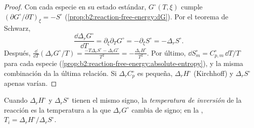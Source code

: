 \begin{proof}
Con cada especie en su estado estándar, $G^\circ(T, \xi)$ cumple $(\partial
G^\circ/\partial T)_\xi = -S^\circ$ (\cref{prop:b2:reaction-free-energy:dG}).
Por el teorema de Schwarz,
\[
  \frac{\dd\Delta_r G^\circ}{\dd T} = \partial_\xi\partial_T G^\circ =
  -\partial_\xi S^\circ = -\Delta_r S^\circ .
\] Después, $\frac{\dd}{\dd
T}(\Delta_r G^\circ/T) = \frac{-T\Delta_r S^\circ - \Delta_r G^\circ}{T^2} =
-\frac{\Delta_r H^\circ}{T^2}$. Por último, $\dd S^\circ_m = C^\circ_{p,m}\,\dd
T/T$ para cada especie (\cref{prop:b2:reaction-free-energy:absolute-entropy}),
y la misma combinación da la última relación. Si $\Delta_r C^\circ_p$ es
pequeña, $\Delta_r H^\circ$ (Kirchhoff) y $\Delta_r S^\circ$ apenas varían.
\end{proof}

\begin{definition}\label{def:b2:reaction-free-energy:inversion-temperature}
Cuando $\Delta_r H^\circ$ y $\Delta_r S^\circ$ tienen el mismo signo, la
\emph{temperatura de inversión} de la reacción es
la temperatura a la que $\Delta_r G^\circ$ cambia de signo; en la , $T_i = \Delta_r H^\circ/\Delta_r S^\circ$.
\end{definition}

